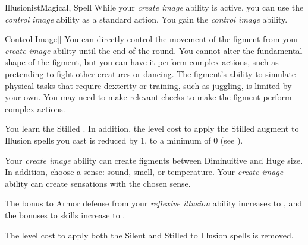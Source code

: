 \begin{feat}{Illusionist}{Magical, Spell}
         While your \textit{create image} ability is active, you can use the \textit{control image} ability as a standard action.
        You gain the \textit{control image} ability.
        \begin{ability}{Control Image}[]
            You can directly control the movement of the figment from your \textit{create image} ability until the end of the round.
            You cannot alter the fundamental shape of the figment, but you can have it perform complex actions, such as pretending to fight other creatures or dancing.
            The figment's ability to simulate physical tasks that require dexterity or training, such as juggling, is limited by your own.
            You may need to make relevant checks to make the figment perform complex actions.
        \end{ability}

         You learn the Stilled .
        In addition, the level cost to apply the Stilled augment to Illusion spells you cast is reduced by 1, to a minimum of 0 (see ).

         Your \textit{create image} ability can create figments between Diminuitive and Huge size.
        In addition, choose a sense: sound, smell, or temperature.
        Your \textit{create image} ability can create sensations with the chosen sense.

         The bonus to Armor defense from your \textit{reflexive illusion} ability increases to , and the bonuses to skills increase to .

         The level cost to apply both the Silent and Stilled  to Illusion spells is removed.
    \end{feat}

